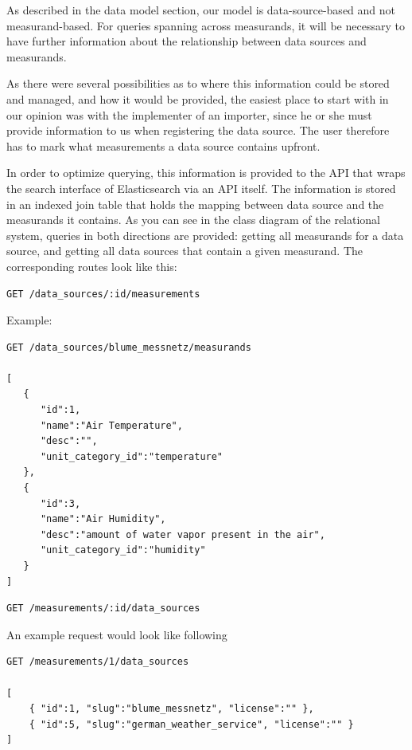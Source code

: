 As described in the data model section, our model is data-source-based
and not measurand-based. For queries spanning across measurands, it will
be necessary to have further information about the relationship between
data sources and measurands.

As there were several possibilities as to where this information could
be stored and managed, and how it would be provided, the easiest place
to start with in our opinion was with the implementer of an importer,
since he or she must provide information to us when registering the data
source. The user therefore has to mark what measurements a data source
contains upfront.

In order to optimize querying, this information is provided to the API
that wraps the search interface of Elasticsearch via an API itself. The
information is stored in an indexed join table that holds the mapping
between data source and the measurands it contains. As you can see in
the class diagram of the relational system, queries
in both directions are provided: getting all measurands for a data
source, and getting all data sources that contain a given measurand. The
corresponding routes look like this:

\begin{verbatim}
GET /data_sources/:id/measurements
\end{verbatim}

Example:

\begin{verbatim}
GET /data_sources/blume_messnetz/measurands

[
   {
      "id":1,
      "name":"Air Temperature",
      "desc":"",
      "unit_category_id":"temperature"
   },
   {
      "id":3,
      "name":"Air Humidity",
      "desc":"amount of water vapor present in the air",
      "unit_category_id":"humidity"
   }
]
\end{verbatim}

\begin{verbatim}
GET /measurements/:id/data_sources
\end{verbatim}

An example request would look like following

\begin{verbatim}
GET /measurements/1/data_sources

[
    { "id":1, "slug":"blume_messnetz", "license":"" },
    { "id":5, "slug":"german_weather_service", "license":"" }
]
\end{verbatim}

